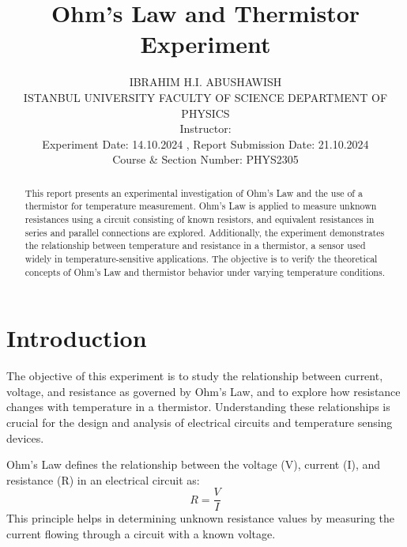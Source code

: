 \documentclass[journal]{IEEEtran}
\begin{document}
\title{Ohm’s Law and Thermistor Experiment}
\author{IBRAHIM H.I. ABUSHAWISH\\
ISTANBUL UNIVERSITY
FACULTY OF SCIENCE
DEPARTMENT OF PHYSICS \\
Instructor:  \\ %
Experiment Date: 14.10.2024 , Report Submission Date: 21.10.2024 \\
Course \& Section Number: PHYS2305}

\maketitle

\maketitle

\begin{abstract}
This report presents an experimental investigation of Ohm's Law and the use of a thermistor for temperature measurement. Ohm's Law is applied to measure unknown resistances using a circuit consisting of known resistors, and equivalent resistances in series and parallel connections are explored. Additionally, the experiment demonstrates the relationship between temperature and resistance in a thermistor, a sensor used widely in temperature-sensitive applications. The objective is to verify the theoretical concepts of Ohm's Law and thermistor behavior under varying temperature conditions.
\end{abstract}

\section{Introduction}
The objective of this experiment is to study the relationship between current, voltage, and resistance as governed by Ohm’s Law, and to explore how resistance changes with temperature in a thermistor. Understanding these relationships is crucial for the design and analysis of electrical circuits and temperature sensing devices.

Ohm's Law defines the relationship between the voltage (V), current (I), and resistance (R) in an electrical circuit as:
\begin{equation}
    R = \frac{V}{I}
\end{equation}
This principle helps in determining unknown resistance values by measuring the current flowing through a circuit with a known voltage.
\end{document}
